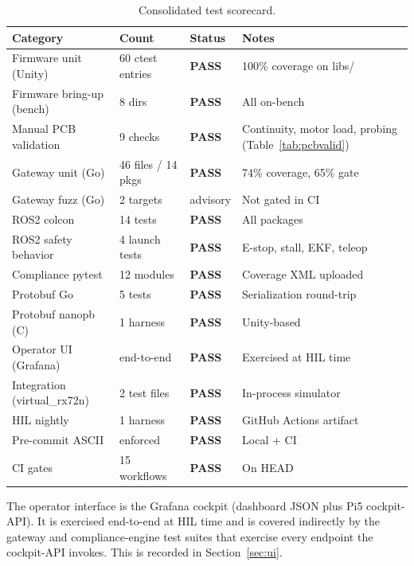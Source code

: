 \documentclass[11pt,letterpaper]{article}
\newcommand{\pass}{{\color{passgreen}\textbf{PASS}}}
\begin{document}
\begin{table}[H]
\centering
\caption{Consolidated test scorecard.}
\label{tab:consolidated}
\small
\begin{tabularx}{\linewidth}{l l l X}
\toprule
\textbf{Category} & \textbf{Count} & \textbf{Status} & \textbf{Notes} \\
\midrule
Firmware unit (Unity)            & 60 ctest entries & \pass{} & 100\% coverage on libs/ \\
Firmware bring-up (bench)        & 8 dirs       & \pass{} & All on-bench \\
Manual PCB validation            & 9 checks     & \pass{} & Continuity, motor load, probing (Table~\ref{tab:pcbvalid}) \\
Gateway unit (Go)                & 46 files / 14 pkgs & \pass{} & 74\% coverage, 65\% gate \\
Gateway fuzz (Go)                & 2 targets    & advisory & Not gated in CI \\
ROS2 colcon                      & 14 tests     & \pass{} & All packages \\
ROS2 safety behavior             & 4 launch tests & \pass{} & E-stop, stall, EKF, teleop \\
Compliance pytest                & 12 modules   & \pass{} & Coverage XML uploaded \\
Protobuf Go                      & 5 tests      & \pass{} & Serialization round-trip \\
Protobuf nanopb (C)              & 1 harness    & \pass{} & Unity-based \\
Operator UI (Grafana)            & end-to-end   & \pass{} & Exercised at HIL time \\
Integration (virtual\_rx72n)     & 2 test files & \pass{} & In-process simulator \\
HIL nightly                      & 1 harness    & \pass{} & GitHub Actions artifact \\
Pre-commit ASCII                 & enforced     & \pass{} & Local + CI \\
CI gates                         & 15 workflows & \pass{} & On HEAD \\
\bottomrule
\end{tabularx}
\end{table}

The operator interface is the Grafana cockpit (dashboard JSON plus
Pi5 cockpit-API). It is exercised end-to-end at HIL time and is
covered indirectly by the gateway and compliance-engine test suites
that exercise every endpoint the cockpit-API invokes. This is
recorded in Section~\ref{sec:ui}.
\end{document}
